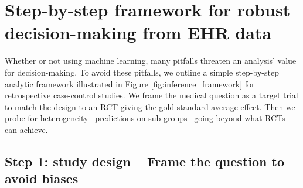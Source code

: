\documentclass[10pt,letterpaper]{article}
\begin{document}
\section*{Step-by-step framework for robust decision-making from EHR data}\label{sec:inference_flow}

Whether or not using machine learning, many pitfalls threaten an analysis'
value for decision-making. To avoid these pitfalls, we outline a simple
step-by-step analytic framework illustrated in Figure
\ref{fig:inference_framework} for retrospective case-control studies. We frame
the medical question as a target trial \cite{hernan2021methods} to match the
design to an RCT giving the gold standard average effect. Then we probe for
heterogeneity --predictions on sub-groups--  going beyond what RCTs can
achieve.

\subsection*{Step 1: study design -- Frame the question to avoid biases}\label{sec:framing}
\end{document}
